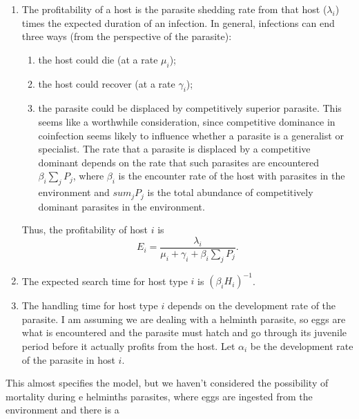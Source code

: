 \documentclass[11pt,reqno,final,pdftex]{amsart}\usepackage[]{graphicx}\usepackage[]{color}
\theoremstyle{plain}
\numberwithin{equation}{part}
\begin{document}
\begin{enumerate}
\item The profitability of a host is the parasite shedding rate from that host ($\lambda_i$) times the expected duration of an infection. In general, infections can end three ways (from the perspective of the parasite):
\begin{enumerate}
\item the host could die (at a rate $\mu_i$);
\item the host could recover (at a rate $\gamma_i$);
\item the parasite could be displaced by competitively superior parasite. This seems like a worthwhile consideration, since competitive dominance in coinfection seems likely to influence whether a parasite is a generalist or specialist. The rate that a parasite is displaced by a competitive dominant depends on the rate that such parasites are encountered $\beta_i \sum_j P_j$, where $\beta_i$ is the encounter rate of the host with parasites in the environment and $sum_j P_j$ is the total abundance of competitively dominant parasites in the environment.
\end{enumerate}
Thus, the profitability of host $i$ is
\begin{equation}
E_i = \frac{\lambda_i}{\mu_i + \gamma_i + \beta_i \sum_j P_j}.
\end{equation}
\item The expected search time for host type $i$ is $(\beta_i H_i)^{-1}$.
\item The handling time for host type $i$ depends on the development rate of the parasite. I am assuming we are dealing with a helminth parasite, so eggs are what is encountered and the parasite must hatch and go through its juvenile period before it actually profits from the host. Let $\alpha_i$ be the development rate of the parasite in host $i$.
\end{enumerate}
This almost specifies the model, but we haven't considered the possibility of mortality during
e helminths parasites, where eggs are ingested from the environment and there is a




\end{document}
